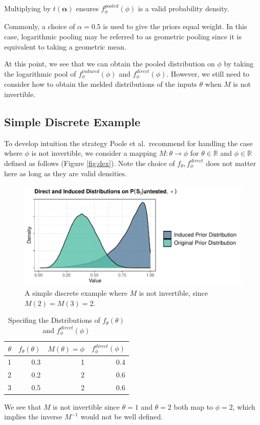 \documentclass[12pt,twoside]{smiththesis}
\begin{document}
Multiplying by \(t(\boldsymbol \alpha)\) ensures \(f_\phi^{pooled} (\phi)\) is a valid probability density.

Commonly, a choice of \(\alpha = 0.5\) is used to give the priors equal weight. In this case, logarithmic pooling may be referred to as geometric pooling since it is equivalent to taking a geometric mean.

At this point, we see that we can obtain the pooled distribution on \(\phi\) by taking the logarithmic pool of \(f^{induced}_\phi(\phi)\) and \(f^{direct}_\phi(\phi)\). However, we still need to consider how to obtain the melded distributions of the inputs \(\theta\) when \(M\) is not invertible.

\hypertarget{simple-discrete-example}{%
\subsection{Simple Discrete Example}\label{simple-discrete-example}}

To develop intuition the strategy Poole et al.~recommend for handling the case where \(\phi\) is not invertible, we consider a mapping \(M: \theta \to \phi\) for \(\theta \in \mathbb{R}\) and \(\phi \in \mathbb{R}\)
defined as follows (Figure \ref{fig:dex}). Note the choice of \(f_\theta,f_\phi^{direct}\) does not matter here as long as they are valid densities.
\begin{figure}

{\centering \includegraphics[width=0.7\linewidth]{thesis_files/figure-latex/unnamed-chunk-11-1} 

}

\caption{\label{fig:dex}A simple discrete example where $M$ is not invertible, since $M(2)=M(3)=2$.}\label{fig:unnamed-chunk-11}
\end{figure}
\begin{table}[H]

\caption{\label{tab:unnamed-chunk-12}\label{table:example-dist}Specifing the Distributions of $f_\theta(\theta)$ and $f_\phi^{direct}(\phi)$}
\centering
\begin{tabular}[t]{r|r|r|r}
\hline
$\theta$ & $f_\theta(\theta)$ & $M(\theta)=\phi$ & $f_\phi^{direct}(\phi)$\\
\hline
1 & 0.3 & 1 & 0.4\\
\hline
2 & 0.2 & 2 & 0.6\\
\hline
3 & 0.5 & 2 & 0.6\\
\hline
\end{tabular}
\end{table}
We see that \(M\) is not invertible since \(\theta=1\) and \(\theta = 2\) both map to \(\phi=2\), which implies the inverse \(M^{-1}\) would not be well defined.
\end{document}
